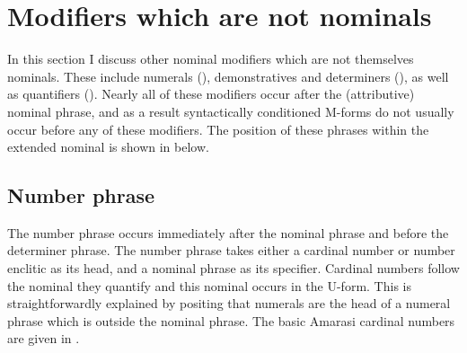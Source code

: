 \section{Modifiers which are not nominals}\label{sec:OthNomMod}
In this section I discuss other nominal modifiers
which are not themselves nominals.
These include numerals (),
demonstratives and determiners (),
as well as quantifiers ().
Nearly all of these modifiers occur after the (attributive) nominal phrase,
and as a result syntactically conditioned M-forms do not usually occur before any of these modifiers.
The position of these phrases within the extended nominal is shown in  below.

\begin{exe}
	\label{tr:ExtNom3}
\end{exe}



\subsection{Number phrase}\label{sec:NumPhr}
The number phrase occurs immediately after the nominal phrase
and before the determiner phrase.
The number phrase takes either a cardinal number or number enclitic
as its head, and a nominal phrase as its specifier.
Cardinal numbers follow the nominal they quantify and this nominal occurs in the U-form.
This is straightforwardly explained by positing that numerals
are the head of a numeral phrase which is outside the nominal phrase.
The basic Amarasi cardinal numbers are given in .

